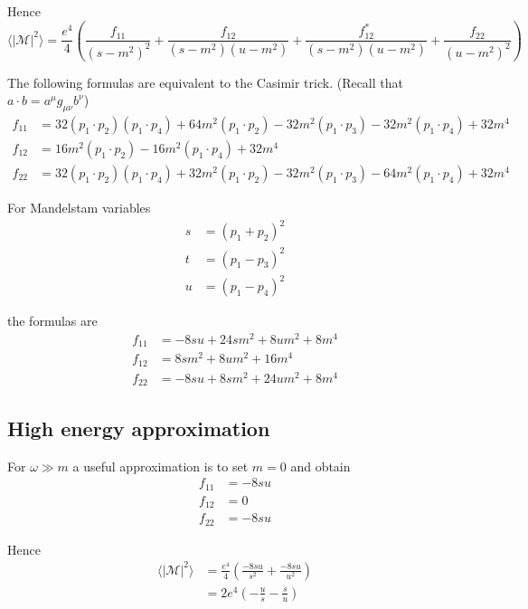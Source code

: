 \documentclass[12pt]{article}
\begin{document}
\noindent
Hence
\begin{equation*}
\langle|\mathcal{M}|^2\rangle
=
\frac{e^4}{4}
\left(
\frac{f_{11}}{(s-m^2)^2}
+\frac{f_{12}}{(s-m^2)(u-m^2)}
+\frac{f_{12}^*}{(s-m^2)(u-m^2)}
+\frac{f_{22}}{(u-m^2)^2}
\right)
\tag{1}
\end{equation*}

\noindent
The following formulas are equivalent to the Casimir trick.
(Recall that $a\cdot b=a^\mu g_{\mu\nu}b^\nu$)
\begin{align*}
f_{11}&=
 32 (p_1 \cdot p_2) (p_1 \cdot p_4) +
 64 m^2 (p_1 \cdot p_2) -
 32 m^2 (p_1 \cdot p_3) -
 32 m^2 (p_1 \cdot p_4) + 32 m^4
\\
f_{12}&=16 m^2 (p_1 \cdot p_2) - 16 m^2 (p_1 \cdot p_4) + 32m^4
\\
f_{22}&=
32 (p_1 \cdot p_2) (p_1 \cdot p_4) +
32 m^2 (p_1 \cdot p_2) -
32 m^2 (p_1 \cdot p_3) -
64 m^2 (p_1 \cdot p_4) + 32 m^4
\end{align*}

\noindent
For Mandelstam variables
\begin{align*}
s&=(p_1+p_2)^2
\\
t&=(p_1-p_3)^2
\\
u&=(p_1-p_4)^2
\end{align*}

the formulas are
\begin{equation*}
\begin{aligned}
f_{11}&=-8 s u + 24 s m^2 + 8 u m^2 + 8 m^4
\\
f_{12}&=8 s m^2 + 8 u m^2 + 16 m^4
\\
f_{22}&=-8 s u + 8 s m^2 + 24 u m^2 + 8 m^4
\end{aligned}
\tag{2}
\end{equation*}

\subsection*{High energy approximation}
For $\omega\gg m$ a useful approximation is to set $m=0$ and obtain
\begin{align*}
f_{11}&=-8su
\\
f_{12}&=0
\\
f_{22}&=-8su
\end{align*}

\noindent
Hence
\begin{align*}
\langle|\mathcal{M}|^2\rangle
&=\frac{e^4}{4}
\left(\frac{-8su}{s^2}+\frac{-8su}{u^2}\right)
\\
&=2e^4
\left(-\frac{u}{s}-\frac{s}{u}\right)
\end{align*}
\end{document}
